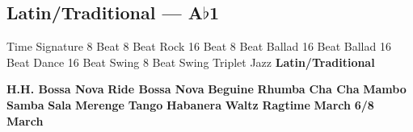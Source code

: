 \subsection{Latin/Traditional --- \UiKey{\II}\UiKey{\MET}A$\flat$1}
Time Signature
8 Beat
8 Beat Rock
16 Beat
8 Beat Ballad
16 Beat Ballad
16 Beat Dance
16 Beat Swing
8 Beat Swing
Triplet
Jazz
\textbf{Latin/Traditional}





























\textbf{H.H. Bossa Nova}
\textbf{Ride Bossa Nova}
\textbf{Beguine}
\textbf{Rhumba}
\textbf{Cha Cha}
\textbf{Mambo}
\textbf{Samba}
\textbf{Sala}
\textbf{Merenge}
\textbf{Tango}
\textbf{Habanera}
\textbf{Waltz}
\textbf{Ragtime}
\textbf{March}
\textbf{6/8 March}
